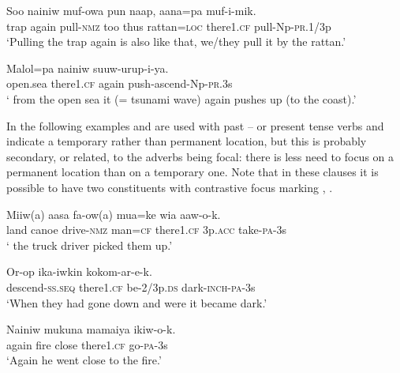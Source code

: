\ea%
\label{ex:3:x1197}
\gll Soo nainiw muf-owa pun naap, aana=pa  muf-i-mik. \\
trap again pull-\textsc{nmz} too thus rattan=\textsc{loc} there1.\textsc{cf} pull-Np-\textsc{pr}.1/3p\\
\glt`Pulling the trap again is also like that, we/they pull it  by the rattan.'
\z

\ea%
\label{ex:3:x1198}
\gll Malol=pa  nainiw suuw-urup-i-ya. \\
open.sea there1.\textsc{cf} again push-ascend-Np-\textsc{pr}.3s\\
\glt` from the open sea it (= tsunami wave) again pushes up (to the coast).'
\z

In the following examples  and are used with past  --  or present tense verbs  and indicate a temporary rather than permanent location, but this is probably secondary, or related, to the adverbs being focal: there is less need to focus on a permanent location than on a temporary one. Note that in these clauses it is possible to have two constituents with contrastive focus marking , .

\ea%
\label{ex:3:x1146}
\gll Miiw(a) aasa fa-ow(a) mua=ke  wia aaw-o-k. \\
land canoe drive-\textsc{nmz} man=\textsc{cf} there1.\textsc{cf} 3p.\textsc{acc} take-\textsc{pa}-3s\\
\glt` the truck driver picked them up.'
\z

\ea%
\label{ex:3:x1199}
\gll Or-op  ika-iwkin kokom-ar-e-k. \\
descend-\textsc{ss}.\textsc{seq} there1.\textsc{cf} be-2/3p.\textsc{ds} dark-\textsc{inch}-\textsc{pa}-3s\\
\glt`When they had gone down and were  it became dark.'
\z

\ea%
\label{ex:3:x1200}
\gll Nainiw mukuna mamaiya  ikiw-o-k. \\
again fire close there1.\textsc{cf} go-\textsc{pa}-3s\\
\glt`Again he went  close to the fire.'
\z

